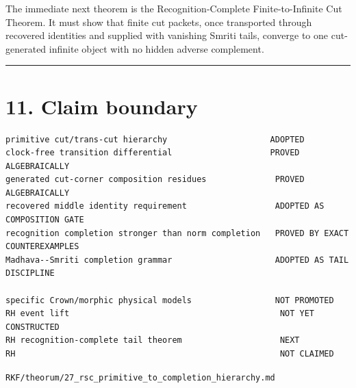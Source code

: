 The immediate next theorem is the Recognition-Complete Finite-to-Infinite Cut
Theorem. It must show that finite cut packets, once transported through
recovered identities and supplied with vanishing Smriti tails, converge to one
cut-generated infinite object with no hidden adverse complement.

\begin{center}\rule{0.5\linewidth}{0.5pt}\end{center}

\hypertarget{claim-boundary}{%
\section{11. Claim boundary}\label{claim-boundary}}

\begin{verbatim}
primitive cut/trans-cut hierarchy                     ADOPTED
clock-free transition differential                    PROVED ALGEBRAICALLY
generated cut-corner composition residues              PROVED ALGEBRAICALLY
recovered middle identity requirement                  ADOPTED AS COMPOSITION GATE
recognition completion stronger than norm completion   PROVED BY EXACT COUNTEREXAMPLES
Madhava--Smriti completion grammar                     ADOPTED AS TAIL DISCIPLINE

specific Crown/morphic physical models                 NOT PROMOTED
RH event lift                                           NOT YET CONSTRUCTED
RH recognition-complete tail theorem                    NEXT
RH                                                      NOT CLAIMED
\end{verbatim}

\begin{flushright}\small\texttt{RKF/theorum/27\_rsc\_primitive\_to\_completion\_hierarchy.md}\end{flushright}

